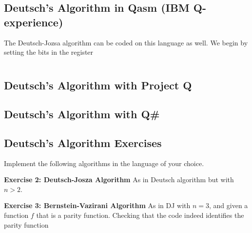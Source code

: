 \newpage
\subsection{Deutsch's Algorithm in Qasm (IBM Q-experience)}
The Deutsch-Jozsa algorithm can be coded on this language as well. We begin by setting the bits in the register 
\begin{lstlisting}[language=Python,float=h]


\end{lstlisting}

\subsection{Deutsch's Algorithm with Project Q}

\subsection{Deutsch's Algorithm with Q\#}


\newpage
\subsection{Deutsch's Algorithm Exercises}

Implement the following algorithms in the language of your choice.

\begin{tcolorbox}[standard jigsaw,
    opacityback=0,  %
    boxrule=0.5pt]
    {\bf Exercise 2: Deutsch-Josza Algorithm}
    \tcbline
    As in Deutsch algorithm but with $n>2$.
\end{tcolorbox}

\begin{tcolorbox}[standard jigsaw,
    opacityback=0,  %
    boxrule=0.5pt]
    {\bf Exercise 3: Bernstein-Vazirani Algorithm}
    \tcbline
    As in DJ with $n=3$, and given a function $f$ that is a parity function. Checking that the code indeed identifies the parity function
\end{tcolorbox}

